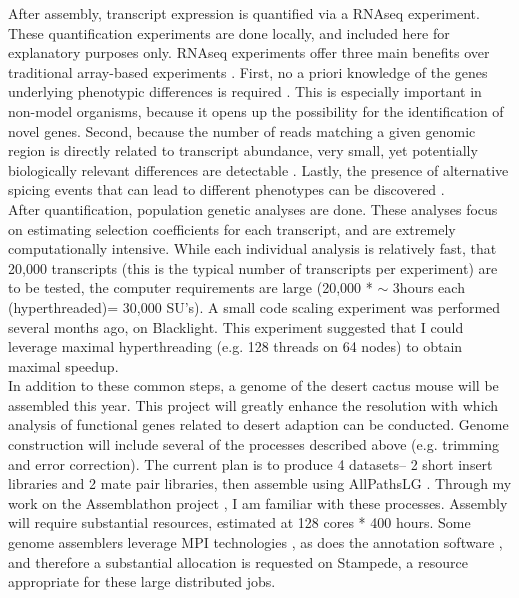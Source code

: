 \documentclass[10.5pt]{article}
\begin{document}
{\noindent
After assembly, transcript expression is quantified via a RNAseq experiment. These quantification experiments are done locally, and included here for explanatory purposes only. RNAseq experiments offer three main benefits over traditional array-based experiments \citep{tHoen:2008hn}. First, no a priori knowledge of the genes underlying phenotypic differences is required \citep{Gilad:2009km}.  This is especially important in non-model organisms, because it opens up the possibility for the identification of novel genes. Second, because the number of reads matching a given genomic region is directly related to transcript abundance, very small, yet potentially biologically relevant differences are detectable \citep{Mortazavi:2008jj}.  Lastly, the presence of alternative spicing events that can lead to different phenotypes can be discovered \citep{Sultan:2008jh}.  \\

\noindent
After quantification, population genetic analyses are done. These analyses focus on estimating selection coefficients for each transcript, and are extremely computationally intensive. While each individual analysis is relatively fast, that 20,000 transcripts (this is the typical number of transcripts per experiment) are to be tested, the computer requirements are large (20,000 * $\sim$ 3hours each (hyperthreaded)= 30,000 SU's). A small code scaling experiment was performed several months ago, on Blacklight. This experiment suggested that I could leverage maximal hyperthreading (e.g. 128 threads on 64 nodes) to obtain maximal speedup.  \\

\noindent
In addition to these common steps, a genome of the desert cactus mouse will be assembled this year. This project will greatly enhance the resolution with which analysis of functional genes related to desert adaption can be conducted. Genome construction will include several of the processes described above (e.g. trimming and error correction). The current plan is to produce 4 datasets-- 2 short insert libraries and 2 mate pair libraries, then assemble using AllPathsLG \citep{Maccallum:2009du}.  Through my work on the Assemblathon project \citep{Bradnam:2013uu}, I am familiar with these processes. Assembly will require substantial resources, estimated at 128 cores * 400 hours. Some genome assemblers leverage MPI technologies \citep{Simpson:2009iv}, as does the annotation software \citep{Cantarel:2008jo}, and therefore a substantial allocation is requested on Stampede, a resource appropriate for these large distributed jobs. 

}
\end{document}
